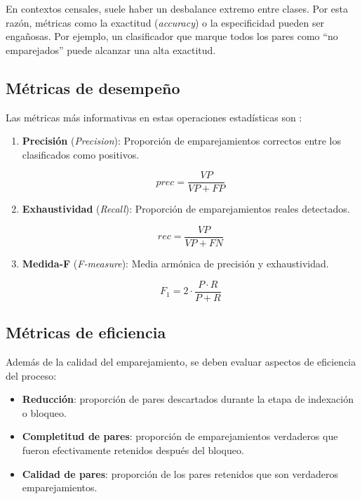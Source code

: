 \documentclass[
  12pt,
]{book}
\providecommand{\tightlist}{%
  \setlength{\itemsep}{0pt}\setlength{\parskip}{0pt}}
\begin{document}
En contextos censales, suele haber un desbalance extremo entre clases. Por esta razón, métricas como la exactitud (\emph{accuracy}) o la especificidad pueden ser engañosas. Por ejemplo, un clasificador que marque todos los pares como ``no emparejados'' puede alcanzar una alta exactitud.

\subsection{Métricas de desempeño}\label{muxe9tricas-de-desempeuxf1o}

Las métricas más informativas en estas operaciones estadísticas son \citep{christen2012data, nauman2022introduction}:

\begin{enumerate}
\def\labelenumi{\arabic{enumi}.}
\item
  \textbf{Precisión} (\emph{Precision}): Proporción de emparejamientos correctos entre los clasificados como positivos.

  \[prec = \frac{VP}{VP + FP}\]
\item
  \textbf{Exhaustividad} (\emph{Recall}): Proporción de emparejamientos reales detectados.

  \[rec = \frac{VP}{VP + FN}\]
\item
  \textbf{Medida-F} (\emph{F-measure}): Media armónica de precisión y exhaustividad.

  \[F_1 = 2 \cdot \frac{P \cdot R}{P + R}\]
\end{enumerate}

\subsection{Métricas de eficiencia}\label{muxe9tricas-de-eficiencia}

Además de la calidad del emparejamiento, se deben evaluar aspectos de eficiencia del proceso:

\begin{itemize}
\tightlist
\item
  \textbf{Reducción}: proporción de pares descartados durante la etapa de indexación o bloqueo.
\item
  \textbf{Completitud de pares}: proporción de emparejamientos verdaderos que fueron efectivamente retenidos después del bloqueo.
\item
  \textbf{Calidad de pares}: proporción de los pares retenidos que son verdaderos emparejamientos.
\end{itemize}
\end{document}

